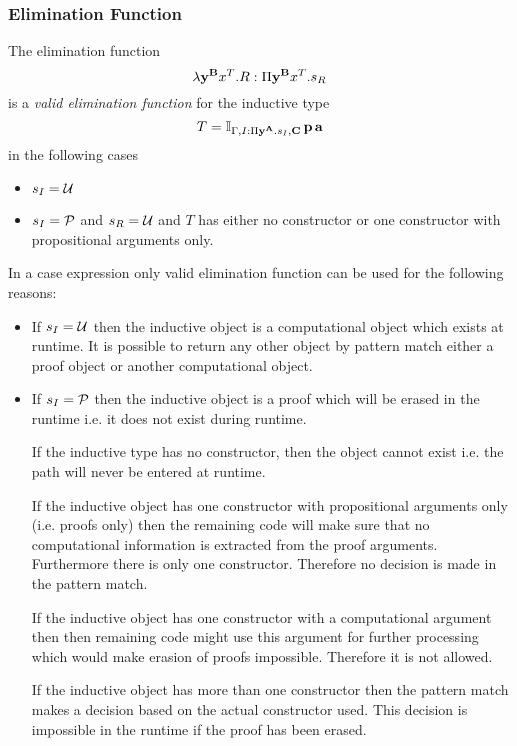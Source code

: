 \subsubsection{Elimination Function}

\begin{definition}
  The elimination function
  $$
  \lambda \mathbf{y}^{\mathbf{B}} x^T.R : \Pi \mathbf{y}^{\mathbf{B}} x^T . s_R
  $$
  is a
  \emph{valid elimination function}
  for the inductive type
  $$
  T = \mathbb{I}_{\Gamma,I:\Pi \mathbf{y}^{\mathbf{A}}.s_I,\mathbf{C}} \, \mathbf{p} \,
  \mathbf{a}
  $$
  in the following cases
  \begin{itemize}

  \item $s_I = {\cal{U}}$

  \item $s_I = {\cal{P}}$ and $s_R = {\cal{U}}$ and $T$ has either no constructor or
    one constructor with propositional arguments only.

  \end{itemize}
\end{definition}
%
In a case expression only valid elimination function can be used for the
following reasons:
\begin{itemize}

\item If $s_I = {\cal{U}}$ then the inductive object is a computational object
  which exists at runtime. It is possible to return any other object by
  pattern match either a proof object or another computational object.

\item If $s_I = {\cal{P}}$ then the inductive object is a proof which will be
  erased in the runtime i.e. it does not exist during runtime.

  If the inductive type has no constructor, then the object cannot exist
  i.e. the path will never be entered at runtime.

  If the inductive object has one constructor with propositional arguments
  only (i.e. proofs only) then the remaining code will make sure that no
  computational information is extracted from the proof arguments. Furthermore
  there is only one constructor. Therefore no decision is made in the pattern
  match.

  If the inductive object has one constructor with a computational argument
  then then remaining code might use this argument for further processing
  which would make erasion of proofs impossible. Therefore it is not allowed.

  If the inductive object has more than one constructor then the pattern match
  makes a decision based on the actual constructor used. This decision is
  impossible in the runtime if the proof has been erased.
\end{itemize}




